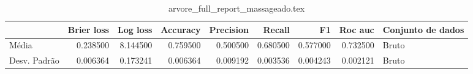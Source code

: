 \begin{table}
\centering
\caption{arvore_full_report_massageado.tex}
\label{arvore_full_report_massageado.tex}
\begin{tabular}{lrrrrrrrl}
\toprule
{} &  Brier  loss &  Log loss &  Accuracy  &  Precision  &   Recall  &       F1  &  Roc auc  & Conjunto de dados \\
\midrule
Média        &     0.238500 &  8.144500 &   0.759500 &    0.500500 &  0.680500 &  0.577000 &  0.732500 &             Bruto \\
Desv. Padrão &     0.006364 &  0.173241 &   0.006364 &    0.009192 &  0.003536 &  0.004243 &  0.002121 &             Bruto \\
\bottomrule
\end{tabular}
\end{table}
